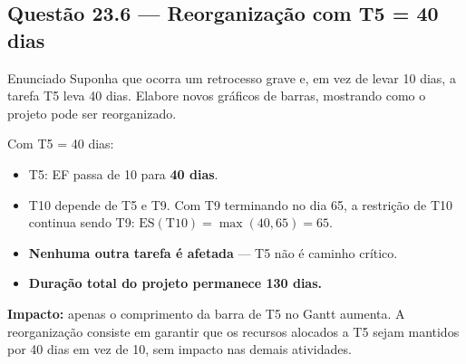 \documentclass[12pt,a4paper]{article}
\begin{document}
\subsection*{Questão 23.6 — Reorganização com T5 = 40 dias}
\begin{questao}{Enunciado}
Suponha que ocorra um retrocesso grave e, em vez de levar 10 dias, a tarefa
T5 leva 40 dias. Elabore novos gráficos de barras, mostrando como o projeto
pode ser reorganizado.
\end{questao}
\begin{resposta}
Com T5 = 40 dias:
\begin{itemize}[nosep]
  \item T5: EF passa de 10 para \textbf{40 dias}.
  \item T10 depende de T5 e T9. Com T9 terminando no dia 65, a restrição
        de T10 continua sendo T9:
        $\text{ES}(\text{T10}) = \max(40, 65) = 65$.
  \item \textbf{Nenhuma outra tarefa é afetada} — T5 não é caminho crítico.
  \item \textbf{Duração total do projeto permanece 130 dias.}
\end{itemize}

\textbf{Impacto:} apenas o comprimento da barra de T5 no Gantt aumenta.
A reorganização consiste em garantir que os recursos alocados a T5 sejam
mantidos por 40 dias em vez de 10, sem impacto nas demais atividades.

\begin{center}
\end{center}
\end{resposta}
\end{document}

